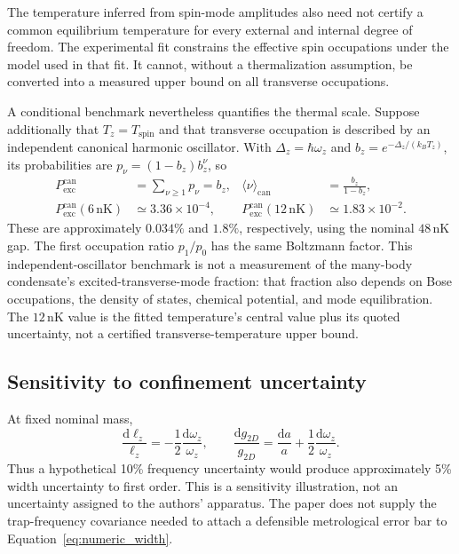 \documentclass[11pt,a4paper]{article}
\theoremstyle{definition}
\theoremstyle{remark}
\newcommand{\dd}{\mathrm{d}}
\newcommand{\lop}{\ell_z}
\begin{document}
The temperature inferred from spin-mode amplitudes also need not certify a common equilibrium temperature for every external and internal degree of freedom. The experimental fit constrains the effective spin occupations under the model used in that fit. It cannot, without a thermalization assumption, be converted into a measured upper bound on all transverse occupations.\cite{zhang2026}

A conditional benchmark nevertheless quantifies the thermal scale. Suppose additionally that $T_z=T_{\mathrm{spin}}$ and that transverse occupation is described by an independent canonical harmonic oscillator. With $\Delta_z=\hbar\omega_z$ and $b_z=e^{-\Delta_z/(k_BT_z)}$, its probabilities are $p_\nu=(1-b_z)b_z^\nu$, so
\begin{equation}
 \begin{aligned}
 P_{\mathrm{exc}}^{\mathrm{can}}&=\sum_{\nu\geq1}p_\nu=b_z,
 &\langle\nu\rangle_{\mathrm{can}}&=\frac{b_z}{1-b_z},\\
 P_{\mathrm{exc}}^{\mathrm{can}}(6\,\mathrm{nK})&\simeq3.36\times10^{-4},
 &P_{\mathrm{exc}}^{\mathrm{can}}(12\,\mathrm{nK})&\simeq1.83\times10^{-2}.
 \end{aligned}
 \tag{21b}\label{eq:conditional_axial_thermal}
\end{equation}
These are approximately $0.034\%$ and $1.8\%$, respectively, using the nominal $48\,\mathrm{nK}$ gap. The first occupation ratio $p_1/p_0$ has the same Boltzmann factor. This independent-oscillator benchmark is not a measurement of the many-body condensate's excited-transverse-mode fraction: that fraction also depends on Bose occupations, the density of states, chemical potential, and mode equilibration. The $12\,\mathrm{nK}$ value is the fitted temperature's central value plus its quoted uncertainty, not a certified transverse-temperature upper bound.\cite{zhang2026,hadzibabic}

\subsection{Sensitivity to confinement uncertainty}
At fixed nominal mass,
\begin{equation}
 \frac{\dd\lop}{\lop}=-\frac12\frac{\dd\omega_z}{\omega_z},
 \qquad
 \frac{\dd g_{2D}}{g_{2D}}
 =\frac{\dd a}{a}+\frac12\frac{\dd\omega_z}{\omega_z}.
 \label{eq:sensitivity}
\end{equation}
Thus a hypothetical 10\% frequency uncertainty would produce approximately 5\% width uncertainty to first order. This is a sensitivity illustration, not an uncertainty assigned to the authors' apparatus. The paper does not supply the trap-frequency covariance needed to attach a defensible metrological error bar to Equation~\eqref{eq:numeric_width}.
\end{document}
